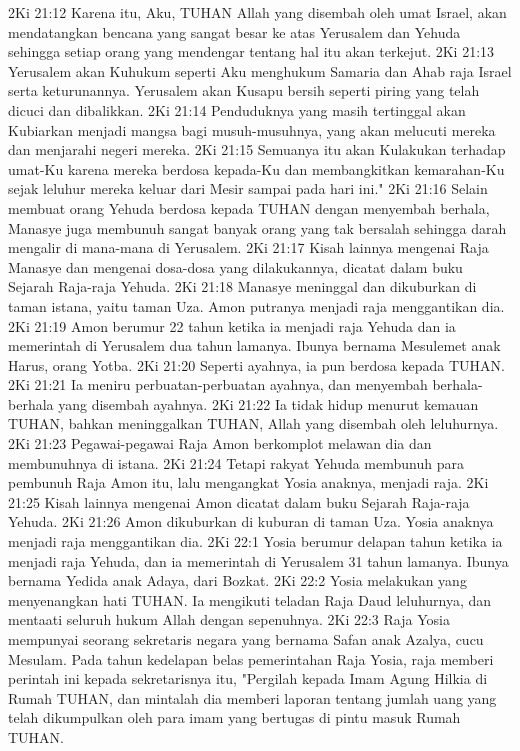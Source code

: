 2Ki 21:12  Karena itu, Aku, TUHAN Allah yang disembah oleh umat Israel, akan mendatangkan bencana yang sangat besar ke atas Yerusalem dan Yehuda sehingga setiap orang yang mendengar tentang hal itu akan terkejut.
2Ki 21:13  Yerusalem akan Kuhukum seperti Aku menghukum Samaria dan Ahab raja Israel serta keturunannya. Yerusalem akan Kusapu bersih seperti piring yang telah dicuci dan dibalikkan.
2Ki 21:14  Penduduknya yang masih tertinggal akan Kubiarkan menjadi mangsa bagi musuh-musuhnya, yang akan melucuti mereka dan menjarahi negeri mereka.
2Ki 21:15  Semuanya itu akan Kulakukan terhadap umat-Ku karena mereka berdosa kepada-Ku dan membangkitkan kemarahan-Ku sejak leluhur mereka keluar dari Mesir sampai pada hari ini."
2Ki 21:16  Selain membuat orang Yehuda berdosa kepada TUHAN dengan menyembah berhala, Manasye juga membunuh sangat banyak orang yang tak bersalah sehingga darah mengalir di mana-mana di Yerusalem.
2Ki 21:17  Kisah lainnya mengenai Raja Manasye dan mengenai dosa-dosa yang dilakukannya, dicatat dalam buku Sejarah Raja-raja Yehuda.
2Ki 21:18  Manasye meninggal dan dikuburkan di taman istana, yaitu taman Uza. Amon putranya menjadi raja menggantikan dia.
2Ki 21:19  Amon berumur 22 tahun ketika ia menjadi raja Yehuda dan ia memerintah di Yerusalem dua tahun lamanya. Ibunya bernama Mesulemet anak Harus, orang Yotba.
2Ki 21:20  Seperti ayahnya, ia pun berdosa kepada TUHAN.
2Ki 21:21  Ia meniru perbuatan-perbuatan ayahnya, dan menyembah berhala-berhala yang disembah ayahnya.
2Ki 21:22  Ia tidak hidup menurut kemauan TUHAN, bahkan meninggalkan TUHAN, Allah yang disembah oleh leluhurnya.
2Ki 21:23  Pegawai-pegawai Raja Amon berkomplot melawan dia dan membunuhnya di istana.
2Ki 21:24  Tetapi rakyat Yehuda membunuh para pembunuh Raja Amon itu, lalu mengangkat Yosia anaknya, menjadi raja.
2Ki 21:25  Kisah lainnya mengenai Amon dicatat dalam buku Sejarah Raja-raja Yehuda.
2Ki 21:26  Amon dikuburkan di kuburan di taman Uza. Yosia anaknya menjadi raja menggantikan dia.
2Ki 22:1  Yosia berumur delapan tahun ketika ia menjadi raja Yehuda, dan ia memerintah di Yerusalem 31 tahun lamanya. Ibunya bernama Yedida anak Adaya, dari Bozkat.
2Ki 22:2  Yosia melakukan yang menyenangkan hati TUHAN. Ia mengikuti teladan Raja Daud leluhurnya, dan mentaati seluruh hukum Allah dengan sepenuhnya.
2Ki 22:3  Raja Yosia mempunyai seorang sekretaris negara yang bernama Safan anak Azalya, cucu Mesulam. Pada tahun kedelapan belas pemerintahan Raja Yosia, raja memberi perintah ini kepada sekretarisnya itu, "Pergilah kepada Imam Agung Hilkia di Rumah TUHAN, dan mintalah dia memberi laporan tentang jumlah uang yang telah dikumpulkan oleh para imam yang bertugas di pintu masuk Rumah TUHAN.
